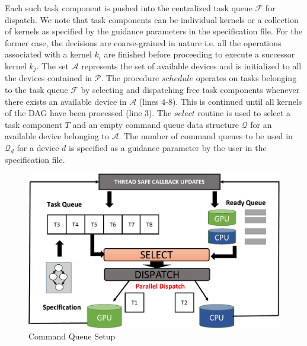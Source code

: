     Each such task component is pushed into the centralized task queue $\mathcal{F}$ for dispatch. We note that task components can be individual kernels or a collection of kernels as specified by the guidance parameters in the specification file. For the former case, the decisions are coarse-grained in nature i.e. all the operations associated with a kernel $k_i$ are finished before proceeding to execute a successor kernel $k_j$.
    The set $\mathcal{A}$ represents the set of available devices and is initialized to all the devices contained in $\mathcal{P}$. The procedure $schedule$ operates on tasks belonging to the task queue $\mathcal{F}$ by selecting and dispatching free task components whenever there exists an available device in $\mathcal{A}$ (lines 4-8). This is continued until all kernels of the DAG have been processed (line 3). The $select$ routine is used to select a task component $T$ and an empty command queue data structure $\mathcal{Q}$ for an available device belonging to $\mathcal{A}$. The number of command queues to be used in $\mathcal{Q}_d$ for a device $d$ is specified as a guidance parameter by the user in the specification file. 
	\begin{figure}[ht]
		\centering
		\includegraphics[scale=0.35]{Pictures/SchedulingEngine.pdf}
		\caption{\small Command Queue Setup\label{fig:schedbackend}}
    \end{figure}
    

